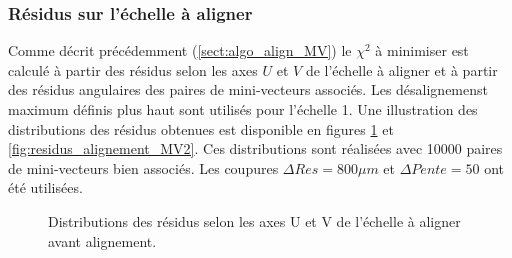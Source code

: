   \subsubsection{R\'esidus sur l'\'echelle \`a aligner}
  \label{sect:residus_echelle1}
  
  Comme d\'ecrit pr\'ec\'edemment (\ref{sect:algo_align_MV}) le $\chi^2$ \`a minimiser est calcul\'e \`a partir des r\'esidus selon les axes $U$ et $V$ de l'\'echelle \`a aligner et à partir des r\'esidus angulaires des paires de mini-vecteurs associ\'es. Les d\'esalignemenst maximum d\'efinis plus haut sont utilis\'es pour l'\'echelle 1. Une illustration des distributions des r\'esidus obtenues est disponible en figures \ref{fig:residus_alignement_MV} et \ref{fig:residus_alignement_MV2}. Ces distributions sont r\'ealis\'ees avec 10000 paires de mini-vecteurs bien associ\'es. Les coupures $\Delta Res = 800 \mu m$ et $\Delta Pente = 50$ ont \'et\'e utilis\'ees. 
  
  \begin{figure}[htb!]
     \begin{center}
     \end{center}
     \caption{Distributions des r\'esidus selon les axes U et V  de l'\'echelle \`a aligner avant alignement.}
     \label{fig:residus_alignement_MV}
   \end{figure}
  
